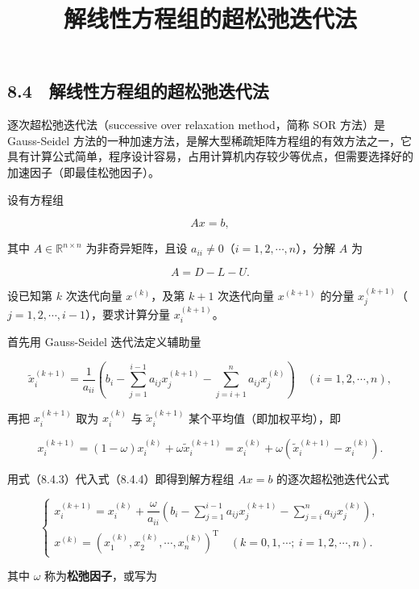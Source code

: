 \documentclass[
  10pt,
  fontset=fandol]{ctexart}
\title{解线性方程组的超松弛迭代法}
\author{}
\date{}
\begin{document}
\maketitle

\subsection{8.4　解线性方程组的超松弛迭代法}\label{ux89e3ux7ebfux6027ux65b9ux7a0bux7ec4ux7684ux8d85ux677eux5f1bux8fedux4ee3ux6cd5}

逐次超松弛迭代法（successive over relaxation method，简称 SOR 方法）是 Gauss-Seidel 方法的一种加速方法，是解大型稀疏矩阵方程组的有效方法之一，它具有计算公式简单，程序设计容易，占用计算机内存较少等优点，但需要选择好的加速因子（即最佳松弛因子）。

设有方程组

\[
Ax=b,
\tag{8.4.1}
\]

其中 \(A\in\mathbb R^{n\times n}\) 为非奇异矩阵，且设 \(a_{ii}\neq0\)（\(i=1,2,\cdots,n\)），分解 \(A\) 为

\[
A=D-L-U.
\tag{8.4.2}
\]

设已知第 \(k\) 次迭代向量 \(x^{(k)}\)，及第 \(k+1\) 次迭代向量 \(x^{(k+1)}\) 的分量 \(x_j^{(k+1)}\)（\(j=1,2,\cdots,i-1\)），要求计算分量 \(x_i^{(k+1)}\)。

首先用 Gauss-Seidel 迭代法定义辅助量

\[
\tilde{x}_i^{(k+1)}=\frac1{a_{ii}}\left(b_i-\sum_{j=1}^{i-1}a_{ij}x_j^{(k+1)}-\sum_{j=i+1}^{n}a_{ij}x_j^{(k)}\right)\quad(i=1,2,\cdots,n),
\tag{8.4.3}
\]

再把 \(x_i^{(k+1)}\) 取为 \(x_i^{(k)}\) 与 \(\tilde{x}_i^{(k+1)}\) 某个平均值（即加权平均），即

\[
x_i^{(k+1)}=(1-\omega)x_i^{(k)}+\omega\tilde{x}_i^{(k+1)}
=x_i^{(k)}+\omega(\tilde{x}_i^{(k+1)}-x_i^{(k)}).
\tag{8.4.4}
\]

用式（8.4.3）代入式（8.4.4）即得到解方程组 \(Ax=b\) 的逐次超松弛迭代公式

\[
\begin{cases}
x_i^{(k+1)}=x_i^{(k)}+\dfrac{\omega}{a_{ii}}\left(b_i-\displaystyle\sum_{j=1}^{i-1}a_{ij}x_j^{(k+1)}-\displaystyle\sum_{j=i}^n a_{ij}x_j^{(k)}\right),\\[5pt]
x^{(k)}=(x_1^{(k)},x_2^{(k)},\cdots,x_n^{(k)})^{\mathrm T}\quad(k=0,1,\cdots;\ i=1,2,\cdots,n).
\end{cases}
\tag{8.4.5}
\]

其中 \(\omega\) 称为\textbf{松弛因子}，或写为
\end{document}
